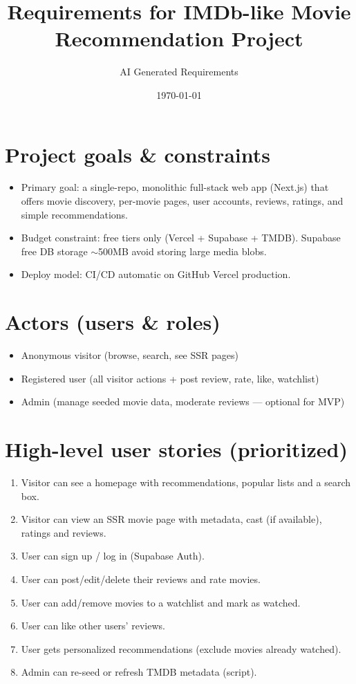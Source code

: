 \documentclass[11pt,a4paper]{article}
\title{Requirements for IMDb-like Movie Recommendation Project}
\author{AI Generated Requirements}
\date{\today}
\begin{document}
\maketitle

\section{Project goals \& constraints}
\begin{itemize}
  \item Primary goal: a single-repo, monolithic full-stack web app (Next.js) that offers movie discovery, per-movie pages, user accounts, reviews, ratings, and simple recommendations.
  \item Budget constraint: free tiers only (Vercel + Supabase + TMDB). Supabase free DB storage $\sim$500MB \textrightarrow{} avoid storing large media blobs.
  \item Deploy model: CI/CD automatic on GitHub \textrightarrow{} Vercel production.
\end{itemize}

\section{Actors (users \& roles)}
\begin{itemize}
  \item Anonymous visitor (browse, search, see SSR pages)
  \item Registered user (all visitor actions + post review, rate, like, watchlist)
  \item Admin (manage seeded movie data, moderate reviews — optional for MVP)
\end{itemize}

\section{High-level user stories (prioritized)}
\begin{enumerate}
  \item Visitor can see a homepage with recommendations, popular lists and a search box.
  \item Visitor can view an SSR movie page with metadata, cast (if available), ratings and reviews.
  \item User can sign up / log in (Supabase Auth).
  \item User can post/edit/delete their reviews and rate movies.
  \item User can add/remove movies to a watchlist and mark as watched.
  \item User can like other users’ reviews.
  \item User gets personalized recommendations (exclude movies already watched).
  \item Admin can re-seed or refresh TMDB metadata (script).
\end{enumerate}
\end{document}
